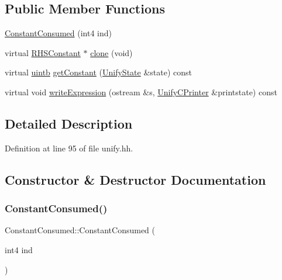 \subsection*{Public Member Functions}
\begin{DoxyCompactItemize}
\item 
\mbox{\hyperlink{class_constant_consumed_aba7185564e48c539c5a913e08a190edf}{Constant\+Consumed}} (int4 ind)
\item 
virtual \mbox{\hyperlink{class_r_h_s_constant}{R\+H\+S\+Constant}} $\ast$ \mbox{\hyperlink{class_constant_consumed_acb2b2e7bbebab6c8b925819d9a6e05a5}{clone}} (void)
\item 
virtual \mbox{\hyperlink{types_8h_a2db313c5d32a12b01d26ac9b3bca178f}{uintb}} \mbox{\hyperlink{class_constant_consumed_a20ea358cc8895b5f58a59e9de98474f2}{get\+Constant}} (\mbox{\hyperlink{class_unify_state}{Unify\+State}} \&state) const
\item 
virtual void \mbox{\hyperlink{class_constant_consumed_a5c8df9f2bf40e042610b157d5a15f3c0}{write\+Expression}} (ostream \&s, \mbox{\hyperlink{class_unify_c_printer}{Unify\+C\+Printer}} \&printstate) const
\end{DoxyCompactItemize}


\subsection{Detailed Description}


Definition at line 95 of file unify.\+hh.



\subsection{Constructor \& Destructor Documentation}
\mbox{\label{class_constant_consumed_aba7185564e48c539c5a913e08a190edf}} 
\subsubsection{\texorpdfstring{ConstantConsumed()}{ConstantConsumed()}}
{\footnotesize\ttfamily Constant\+Consumed\+::\+Constant\+Consumed (\begin{DoxyParamCaption}\item[{int4}]{ind }\end{DoxyParamCaption})\hspace{0.3cm}{\ttfamily [inline]}}



